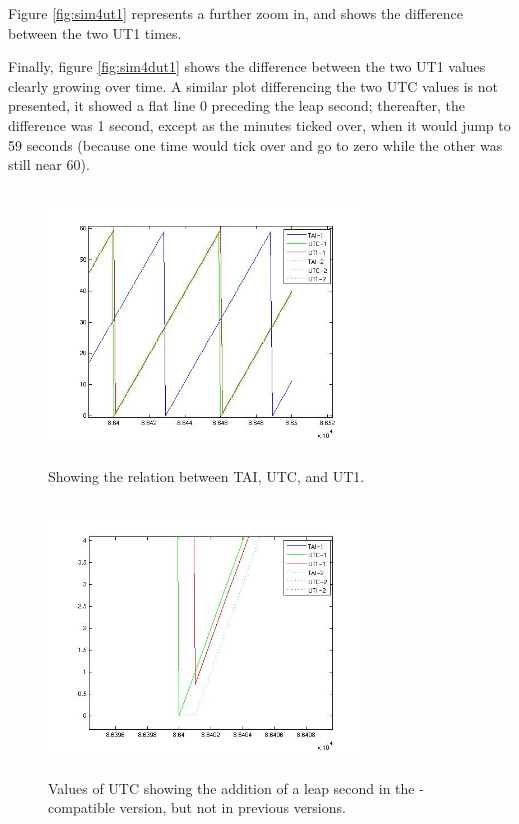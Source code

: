 \begin{description}
Figure \ref{fig:sim4ut1} represents a further zoom in, and shows the difference between the two UT1 times.

Finally, figure \ref{fig:sim4dut1} shows the difference between the two UT1 values clearly growing over time.  A similar plot differencing the two UTC values is not presented, it showed a flat line 0 preceding the leap second; thereafter, the difference was 1 second, except as the minutes ticked over, when it would jump to 59 seconds (because one time would tick over and go to zero while the other was still near 60).

\begin{figure}[htp]
\begin{center}
\includegraphics[width=3.2736in,height=2.85in]{figures/sim4_all.jpg}
\caption{Showing the relation between TAI, UTC, and UT1.}\label{fig:sim4all}
\end{center}
\end{figure}
\begin{figure}[htp]
\begin{center}
\includegraphics[width=3.2736in,height=2.85in]{figures/sim4_leap.jpg}
\caption{Values of UTC showing the addition of a leap second in the \JEODid-compatible version, but not in previous versions.}\label{fig:sim4leap}
\end{center}


\end{figure}
\end{description}
